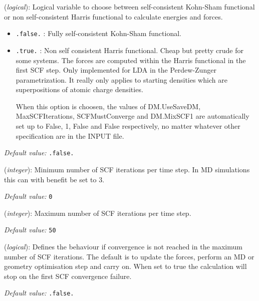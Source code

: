 \begin{description}
\itemsep 10pt
\parsep 0pt

\item[\textbf{Harris\_functional}] (\textit{logical}):
Logical variable to choose between self-consistent Kohn-Sham functional or
 non self-consistent Harris functional to calculate energies and forces.
\begin{itemize}
\item \texttt{.false.} : Fully self-consistent Kohn-Sham functional.
\item \texttt{.true.} : Non self consistent Harris functional. Cheap but
pretty crude for some systems. The forces are computed within the
Harris functional in the first SCF step. Only implemented for LDA in
the Perdew-Zunger parametrization. It really only applies to starting
densities which are superpositions of atomic charge densities.

When this option is choosen, the values of DM.UseSaveDM,
MaxSCFIterations, SCFMustConverge and DM.MixSCF1 are automatically set
up to False, 1, False and False respectively, no matter whatever other
specification are in the INPUT file.
\end{itemize}

\textit{Default value:} \texttt{.false.}

\item[\textbf{MinSCFIterations}] (\textit{integer}):
Minimum number of SCF iterations per time step. In MD simulations
this can with benefit be set to 3.

\textit{Default value:} \texttt{0}

\item[\textbf{MaxSCFIterations}] (\textit{integer}):
Maximum number of SCF iterations per time step.

\textit{Default value:} \texttt{50}

\item[\textbf{SCFMustConverge}] (\textit{logical}):
Defines the behaviour if convergence is not reached in the maximum
number of SCF iterations. The default is to update the forces, perform
an MD or geometry optimisation step and carry on. When set to true
the calculation will stop on the first SCF convergence failure.

\textit{Default value:} \texttt{.false.}

\end{description}

